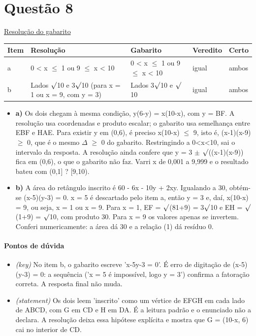 \documentclass{article}%
\begin{document}
\section*{Questão 8}%
\href{https://poliedroresolve.sistemapoliedro.com.br/vestibulares/ita/2027/ita-2-fase-dia-1-20-10-2026-2-fase-dia-1/dissertativa-8-matematica-2-fase-dia-1-ita-2027}{Resolução do gabarito}\par\smallskip%
\begin{longtable}{@{}p{} p{} p{} p{} p{}@{}}\toprule Item & Resolução & Gabarito & Veredito & Certo \\ \midrule
a & 0 < x $\leq$ 1 ou 9 $\leq$ x < 10 & 0 < x $\leq$ 1 ou 9 $\leq$ x < 10 & igual & ambos \\
b & Lados $\surd$10 e 3$\surd$10 (para x = 1 ou x = 9, com y = 3) & Lados 3$\surd$10 e $\surd$10 & igual & ambos \\
\bottomrule\end{longtable}%
\begin{itemize}%
\item%
\textbf{a)} Os dois chegam à mesma condição, y(6-y) = x(10-x), com y = BF. A resolução usa coordenadas e produto escalar; o gabarito usa semelhança entre EBF e HAE. Para existir y em (0,6), é preciso x(10-x) $\leq$ 9, isto é, (x-1)(x-9) $\geq$ 0, que é o mesmo $\Delta$ $\geq$ 0 do gabarito. Restringindo a 0<x<10, sai o intervalo da resposta. A resolução ainda confere que y = 3 $\pm$ $\surd$((x-1)(x-9)) fica em (0,6), o que o gabarito não faz. Varri x de 0,001 a 9,999 e o resultado bateu com (0,1{]} ? {[}9,10).%
\item%
\textbf{b)} A área do retângulo inscrito é 60 - 6x - 10y + 2xy. Igualando a 30, obtém{-}se (x-5)(y-3) = 0. x = 5 é descartado pelo item a, então y = 3 e, daí, x(10-x) = 9, ou seja, x = 1 ou x = 9. Para x = 1, EF = $\surd$(81+9) = 3$\surd$10 e EH = $\surd$(1+9) = $\surd$10, com produto 30. Para x = 9 os valores apenas se invertem. Conferi numericamente: a área dá 30 e a relação (1) dá resíduo 0.%
\end{itemize}%
\paragraph{Pontos de dúvida}%
\begin{itemize}%
\item%
\textit{(key)} No item b, o gabarito escreve 'x-5y-3 = 0'. É erro de digitação de (x-5)(y-3) = 0: a sequência ('x = 5 é impossível, logo y = 3') confirma a fatoração correta. A resposta final não muda.%
\item%
\textit{(statement)} Os dois leem 'inscrito' como um vértice de EFGH em cada lado de ABCD, com G em CD e H em DA. É a leitura padrão e o enunciado não a declara. A resolução deixa essa hipótese explícita e mostra que G = (10-x, 6) cai no interior de CD.%
\end{itemize}%
\end{document}

